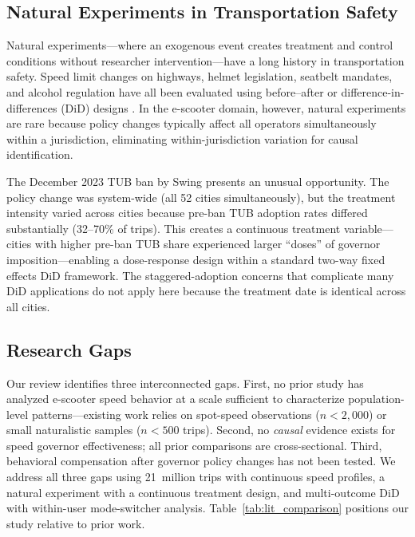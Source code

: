 \subsection{Natural Experiments in Transportation Safety}
\label{sec:bg_natural}

Natural experiments---where an exogenous event creates treatment and control conditions without researcher inter\-vention---have a long history in transportation safety. Speed limit changes on highways, helmet legislation, seatbelt mandates, and alcohol regulation have all been evaluated using before--after or difference-in-differences (DiD) designs \citep{elvik2013reexamination}. In the e-scooter domain, however, natural experiments are rare because policy changes typically affect all operators simultaneously within a jurisdiction, eliminating within-jurisdiction variation for causal identification.

The December 2023 TUB ban by Swing presents an unusual opportunity. The policy change was system-wide (all 52 cities simultaneously), but the treatment intensity varied across cities because pre-ban TUB adoption rates differed substantially (32--70\% of trips). This creates a continuous treatment variable---cities with higher pre-ban TUB share experienced larger ``doses'' of governor imposition---enabling a dose-response design within a standard two-way fixed effects DiD framework. The staggered-adoption concerns that complicate many DiD applications \citep{roth2022pretest} do not apply here because the treatment date is identical across all cities.

\subsection{Research Gaps}
\label{sec:bg_gaps}

Our review identifies three interconnected gaps. First, no prior study has analyzed e-scooter speed behavior at a scale sufficient to characterize population-level patterns---existing work relies on spot-speed observations ($n < 2{,}000$) or small naturalistic samples ($n < 500$ trips). Second, no \textit{causal} evidence exists for speed governor effectiveness; all prior comparisons are cross-sectional. Third, behavioral compensation after governor policy changes has not been tested. We address all three gaps using 21~million trips with continuous speed profiles, a natural experiment with a continuous treatment design, and multi-outcome DiD with within-user mode-switcher analysis. Table~\ref{tab:lit_comparison} positions our study relative to prior work.

